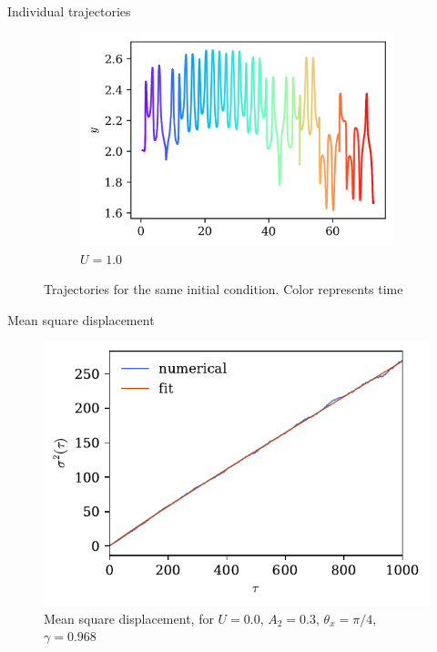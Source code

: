 \documentclass[10pt]{beamer}
\begin{document}
\begin{frame}{Individual trajectories}
\begin{figure}[h]
\begin{subfigure}[b]{0.3\textwidth}
    \includegraphics[width=\textwidth]{graf_2ondas/2w_1.0.png}
    \caption{$U = 1.0$}
\end{subfigure}


\caption{Trajectories for the same initial condition. Color represents time}
\label{traj2w}
\end{figure}

\end{frame}


\begin{frame}{Mean square displacement}

\begin{figure}[h]
\centering
\includegraphics[scale = 0.75]{graf_2ondas/msd1.pdf}
\caption{Mean square displacement, for $U = 0.0$, $A_2 = 0.3$, $\theta_x = \pi/4$,  $\gamma = 0.968$}
\label{sigmaquadrado}
\end{figure}

\end{frame}
\end{document}
